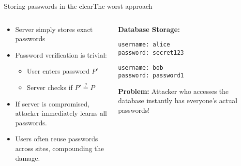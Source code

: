 \documentclass[aspectratio=169, lualatex, handout]{beamer}
\begin{document}
\begin{frame}{Storing passwords in the clear}{The worst approach}
	\begin{columns}[c]
		\begin{column}{0.55\textwidth}
			\begin{itemize}
				\item Server simply stores exact passwords
				\item Password verification is trivial:
				      \begin{itemize}
					      \item User enters password $P'$
					      \item Server checks if $P' \stackrel{?}{=} P$
				      \end{itemize}
				\item If server is compromised, attacker immediately learns all passwords.
				\item Users often reuse passwords across sites, compounding the damage.
			\end{itemize}
		\end{column}
		\begin{column}{0.45\textwidth}
			\begin{tcolorbox}[colback=black!5!white,colframe=ciphergray]
				\textbf{Database Storage:}

				\vspace{0.2cm}

				\texttt{username: alice}\\
				\texttt{password: secret123}

				\vspace{0.2cm}

				\texttt{username: bob}\\
				\texttt{password: password1}

				\vspace{0.3cm}

				\textcolor{cipherprimary}{\textbf{Problem:} \small Attacker who accesses the database instantly has everyone's actual passwords!}
			\end{tcolorbox}
		\end{column}
	\end{columns}
\end{frame}
\end{document}
